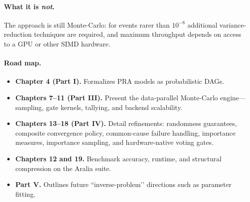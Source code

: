 \paragraph*{What it is \emph{not}.}
The approach is still Monte-Carlo: for events rarer than
\(10^{-8}\) additional variance-reduction techniques are required, and
maximum throughput depends on access to a GPU or other SIMD hardware.


\paragraph*{Road map.}
\begin{itemize}
  \item \textbf{Chapter 4 (Part I).} Formalizes PRA models as probabilistic DAGs. 
  \item \textbf{Chapters 7–11 (Part III).} Present the data-parallel Monte-Carlo engine—sampling, gate kernels, tallying, and backend scalability. 
  \item \textbf{Chapters 13–18 (Part IV).} Detail refinements: randomness guarantees, composite convergence policy, common-cause failure handling, importance measures, importance sampling, and hardware-native voting gates. 
  \item \textbf{Chapters 12 and 19.} Benchmark accuracy, runtime, and structural compression on the Aralia suite. 
  \item \textbf{Part V.} Outlines future “inverse-problem’’ directions such as parameter fitting.
\end{itemize}

\clearpage

